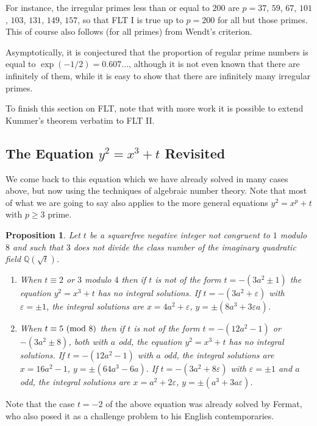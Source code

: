\documentclass[12pt,a4paper]{article}
\newcommand{\Q}{{\mathbb Q}}
\newcommand{\eps}{\varepsilon}
\newtheorem{proposition}[theorem]{Proposition}
\renewcommand{\pmod}[1]{\allowbreak\ ({\rm{mod}}\,\,#1)}
\begin{document}
For instance, the irregular primes less than or equal to $200$ are
$p=37$, $59$, $67$, $101$, $103$, $131$, $149$, $157$, so that FLT I is true
up to $p=200$ for all but those primes. This of course also follows (for all
primes) from Wendt's criterion.

\smallskip

Asymptotically, it is conjectured that the proportion of regular prime
numbers is equal to $\exp(-1/2)=0.607\dots$, although it is not even known
that there are infinitely of them, while it is easy to show that there are
infinitely many irregular primes.

To finish this section on FLT, note that with more work it is possible to
extend Kummer's theorem verbatim to FLT II.

\subsection{The Equation $y^2=x^3+t$ Revisited}

We come back to this equation which we have already solved in many cases above,
but now using the techniques of algebraic number theory. Note that most of
what we are going to say also applies to the more general equations
$y^2=x^p+t$ with $p\ge3$ prime.

\begin{proposition}\label{y2t3} Let $t$ be a squarefree negative integer
not congruent to $1$ modulo $8$ and such that $3$ does not divide
the class number of the imaginary quadratic field $\Q(\sqrt{t})$.
\begin{enumerate}\item When $t\equiv2$ or $3$ modulo $4$ then if $t$ is 
not of the form $t=-(3a^2\pm1)$ the equation $y^2=x^3+t$ has no integral 
solutions. If $t=-(3a^2+\eps)$ with $\eps=\pm1$, the integral solutions are 
$x=4a^2+\eps$, $y=\pm(8a^3+3\eps a)$.
\item When $t\equiv5\pmod8$ then if $t$ is not of the form 
$t=-(12a^2-1)$ or $-(3a^2\pm8)$, both with $a$ odd, the equation $y^2=x^3+t$ 
has no integral solutions. If $t=-(12a^2-1)$ with $a$ odd, the integral 
solutions are $x=16a^2-1$, $y=\pm(64a^3-6a)$. If $t=-(3a^2+8\eps)$ with 
$\eps=\pm1$ and $a$ odd, the integral solutions are $x=a^2+2\eps$, 
$y=\pm(a^3+3a\eps)$.\end{enumerate}
\end{proposition}

Note that the case $t=-2$ of the above equation was already solved by Fermat, 
who also posed it as a challenge problem to his English contemporaries.
\end{document}
